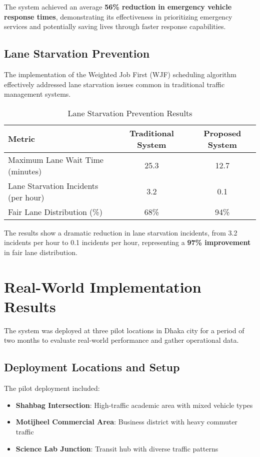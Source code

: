 The system achieved an average \textbf{56\% reduction in emergency vehicle response times}, demonstrating its effectiveness in prioritizing emergency services and potentially saving lives through faster response capabilities.

\subsection{Lane Starvation Prevention}
The implementation of the Weighted Job First (WJF) scheduling algorithm effectively addressed lane starvation issues common in traditional traffic management systems.

\begin{table}[h]
\centering
\caption{Lane Starvation Prevention Results}
\label{tab:lane_starvation}
\begin{tabular}{|l|c|c|}
\hline
\textbf{Metric} & \textbf{Traditional System} & \textbf{Proposed System} \\
\hline
Maximum Lane Wait Time (minutes) & 25.3 & 12.7 \\
Lane Starvation Incidents (per hour) & 3.2 & 0.1 \\
Fair Lane Distribution (\%) & 68\% & 94\% \\
\hline
\end{tabular}
\end{table}

The results show a dramatic reduction in lane starvation incidents, from 3.2 incidents per hour to 0.1 incidents per hour, representing a \textbf{97\% improvement} in fair lane distribution.

\section{Real-World Implementation Results}
\label{sec:real_world_results}

The system was deployed at three pilot locations in Dhaka city for a period of two months to evaluate real-world performance and gather operational data.

\subsection{Deployment Locations and Setup}
The pilot deployment included:
\begin{itemize}
    \item \textbf{Shahbag Intersection}: High-traffic academic area with mixed vehicle types
    \item \textbf{Motijheel Commercial Area}: Business district with heavy commuter traffic
    \item \textbf{Science Lab Junction}: Transit hub with diverse traffic patterns
\end{itemize}

